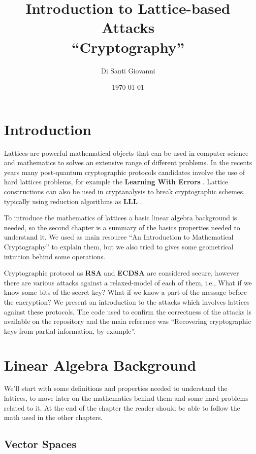 \documentclass[a4paper,12pt]{report}
\title{Introduction to Lattice-based Attacks\\``Cryptography''}
\author{Di Santi Giovanni}
\date{\today}
\begin{document}
 
\maketitle

\tableofcontents

\chapter{Introduction}

Lattices are powerful mathematical objects that can be used in computer science and mathematics to solves an extensive range of different problems.
In the recents years many post-quantum cryptographic protocols candidates involve the use of hard lattices problems,
for example the \textbf{Learning With Errors} \cite{LWE}.
Lattice constructions can also be used in cryptanalysis to break cryptographic schemes, typically using reduction
algorithms as \textbf{LLL} \cite{LLL}.

To introduce the mathematics of lattices a basic linear algebra background is needed, so the second chapter is a summary of the
basics properties needed to understand it. We used as main resource ``An Introduction to Mathematical Cryptography''\cite{mathcrypto14} to
explain them, but we also tried to gives some geometrical intuition behind some operations.

Cryptographic protocol as \textbf{RSA} and \textbf{ECDSA} are considered secure, however there are various attacks against a
relaxed-model of each of them, i.e., What if we know some bits of the secret key? What if we know a part of the message before the encryption?
We present an introduction to the attacks which involves lattices against these protocols. The code used to confirm the correctness
of the attacks is available on the repository \cite{repo} and the main reference was
``Recovering cryptographic keys from partial information, by example''\cite{cryptoeprint:2020:1506}.

\chapter{Linear Algebra Background}

We'll start with some definitions and properties needed to understand the lattices, to move later on the mathematics behind them and some
hard problems related to it. At the end of the chapter the reader should be able to follow the math used in the other chapters.

\section{Vector Spaces}
\end{document}
